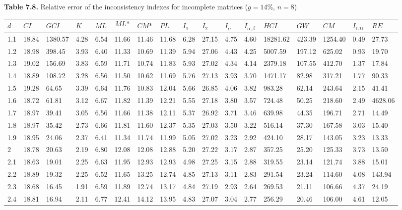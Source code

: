 \newpage
\textbf{Table 7.8.} Relative error of the inconsistency indexes for incomplete matrices ($g=14\%$, $n=8$)
\begin{adjustbox}{angle=90}
  \begin{center}
    \begin{tabular}{|l|llllllllllllllll|}
      \hline $d$ &
$\textit{CI}$&$\textit{GCI}$&$K$&$\textit{ML}$&$$\textit{ML*}$$&$\textit{CM*}$&$\textit{PL}$&$\textit{I}_1$&$\textit{I}_2$&$\textit{I}_{\alpha}$&$\textit{I}_{\alpha,\beta}$&$\textit{HCI}$&$\textit{GW}$&$\textit{CM}$&$\textit{I}_{CD}$&$\textit{RE}$\\ \hline \hline
1.1&18.84&1380.57&4.28&6.54&11.66&11.46&11.68&6.28&27.15&4.75&4.60&18281.62&423.39&1254.40&0.49&27.73  \\ 
1.2&18.98&398.45&3.93&6.40&11.33&10.69&11.39&5.94&27.06&4.43&4.25&5007.59&197.12&625.02&0.93&19.70  \\ 
1.3&19.02&156.69&3.83&6.59&11.71&10.74&11.83&5.93&27.02&4.34&4.14&2379.18&107.55&412.70&1.37&17.84  \\ 
1.4&18.89&108.72&3.28&6.56&11.50&10.62&11.69&5.76&27.13&3.93&3.70&1471.17&82.98&317.21&1.77&90.33  \\ 
1.5&19.28&64.65&3.39&6.64&11.76&10.83&12.04&5.66&26.85&4.06&3.82&983.28&62.14&243.64&2.15&41.41  \\ 
1.6&18.72&61.81&3.12&6.67&11.82&11.39&12.21&5.55&27.18&3.80&3.57&724.48&50.25&218.60&2.49&4628.06  \\ 
1.7&18.97&39.41&3.05&6.56&11.66&11.38&12.11&5.37&26.92&3.71&3.46&639.98&44.35&196.71&2.71&14.49  \\ 
1.8&18.97&35.42&2.73&6.66&11.81&11.60&12.37&5.35&27.03&3.50&3.22&516.14&37.30&167.58&3.03&15.40  \\ 
1.9&18.95&24.06&2.37&6.41&11.34&11.74&11.99&5.05&27.02&3.23&2.92&424.10&28.17&143.05&3.23&13.33  \\ 
2&18.78&20.63&2.19&6.80&12.08&12.08&12.88&5.20&27.22&3.17&2.87&357.25&25.20&125.33&3.73&13.50  \\ 
2.1&18.63&19.01&2.25&6.63&11.95&12.93&12.93&4.98&27.25&3.15&2.88&319.55&23.14&121.74&3.88&15.01  \\ 
2.2&18.89&19.32&2.25&6.52&11.65&13.25&12.74&4.85&27.13&3.11&2.83&291.54&23.24&114.60&4.08&143.94  \\ 
2.3&18.68&16.45&1.91&6.59&11.89&12.74&13.17&4.84&27.19&2.93&2.64&269.53&21.11&106.66&4.37&24.19  \\ 
2.4&18.81&16.94&2.11&6.77&12.41&14.12&13.95&4.83&27.07&3.04&2.77&256.29&20.46&106.00&4.61&12.05  \\ 

\end{tabular}
\end{center}
\end{adjustbox}
